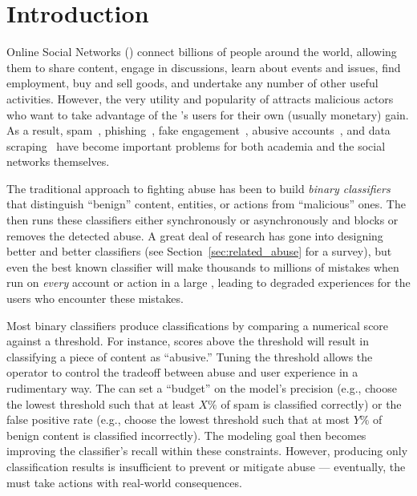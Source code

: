 \section{Introduction}\label{sec:intro}

Online Social Networks (\osns) connect billions of people around the world, allowing them to share content, engage in discussions, learn about events and issues, find employment, buy and sell goods, and undertake any number of other useful activities. However, the very utility and popularity of \osns attracts malicious actors who want to take advantage of the \osn's users for their own (usually monetary) gain. As a result, spam~\cite{ceas2010}, phishing~\cite{jagatic2007social}, fake engagement~\cite{dekoven2018following}, abusive accounts~\cite{xu2021deep}, and data scraping~\cite{musa} have become important problems for both academia and the \ifanon \osns \else social networks \fi themselves.

The traditional approach to fighting \osn abuse has been to build {\em binary classifiers} that distinguish ``benign'' content, entities, or actions from ``malicious'' ones. The \osn then runs these classifiers either synchronously or asynchronously and blocks or removes the detected abuse. A great deal of research has gone into designing better and better classifiers (see Section~\ref{sec:related_abuse} for a survey), but even the best known classifier will make thousands to millions of mistakes when run on {\em every} account or action in a large \osn, leading to degraded experiences for the users who encounter these mistakes.

Most binary classifiers produce classifications by comparing a numerical score against a threshold. For instance, scores above the threshold will result in classifying a piece of content as ``abusive.'' Tuning the threshold allows the operator to control the tradeoff between abuse and user experience in a rudimentary way. The \osn can set a ``budget'' on the model's precision (e.g., choose the lowest threshold such that at least $X\%$ of spam is classified correctly) or the false positive rate (e.g., choose the lowest threshold such that at most $Y\%$ of benign content is classified incorrectly). The modeling goal then becomes improving the classifier's recall within these constraints.  However, producing only classification results is insufficient to prevent or mitigate abuse --- eventually, the \osn must take actions with real-world consequences.

